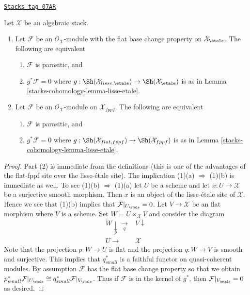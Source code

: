 \begin{lemma}
\label{stacks-cohomology-lemma-parasitic-in-terms-flat-fppf}
\href{https://stacks.math.columbia.edu/tag/07AR}{\texttt{Stacks tag 07AR}}

Let $\mathcal{X}$ be an algebraic stack.
\begin{enumerate}
\item Let $\mathcal{F}$ be an $\mathcal{O}_\mathcal{X}$-module
with the flat base change property on $\mathcal{X}_\etale$.
The following are equivalent
\begin{enumerate}
\item $\mathcal{F}$ is parasitic, and
\item $g^*\mathcal{F} = 0$ where
$g : \Sh(\mathcal{X}_{lisse,\etale}) \to
\Sh(\mathcal{X}_\etale)$ is as in Lemma \ref{stacks-cohomology-lemma-lisse-etale}.
\end{enumerate}
\item Let $\mathcal{F}$ be an $\mathcal{O}_\mathcal{X}$-module on
$\mathcal{X}_{fppf}$. The following are equivalent
\begin{enumerate}
\item $\mathcal{F}$ is parasitic, and
\item $g^*\mathcal{F} = 0$ where
$g :  \Sh(\mathcal{X}_{flat,fppf}) \to \Sh(\mathcal{X}_{fppf})$
is as in Lemma \ref{stacks-cohomology-lemma-lisse-etale}.
\end{enumerate}
\end{enumerate}
\end{lemma}

\begin{proof}
Part (2) is immediate from the definitions (this is one of the advantages
of the flat-fppf site over the lisse-\'etale site). The implication
(1)(a) $\Rightarrow$ (1)(b) is immediate as well. To see (1)(b)
$\Rightarrow$ (1)(a) let $U$ be a scheme and let $x : U \to \mathcal{X}$
be a surjective smooth morphism. Then $x$ is an object of the
lisse-\'etale site of $\mathcal{X}$. Hence we see that (1)(b)
implies that $\mathcal{F}|_{U_\etale} = 0$. Let $V \to \mathcal{X}$
be an flat morphism where $V$ is a scheme. Set $W = U \times_\mathcal{X} V$
and consider the diagram
$$
\begin{array}{cc}W \underset{p}{\downarrow}\underset{q}{\longrightarrow} & V \downarrow \\ U \longrightarrow & \mathcal{X}\end{array}
$$
Note that the projection $p : W \to U$ is flat and the projection
$q : W \to V$ is smooth and surjective. This implies that $q_{small}^*$
is a faithful functor on quasi-coherent modules. By assumption $\mathcal{F}$
has the flat base change property so that we obtain
$p_{small}^*\mathcal{F}|_{U_\etale} \cong
q_{small}^*\mathcal{F}|_{V_\etale}$. Thus if $\mathcal{F}$
is in the kernel of $g^*$, then $\mathcal{F}|_{V_\etale} = 0$
as desired.
\end{proof}


